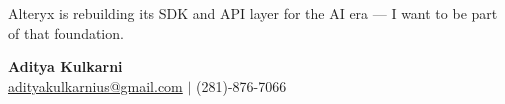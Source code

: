 \documentclass[11pt,letterpaper]{article}
\begin{document}
\vspace{8pt}

Alteryx is rebuilding its SDK and API layer for the AI era --- I want to be part of that foundation.

\vspace{12pt}

{\color{AlteryxPurple} \textbf{Aditya Kulkarni}} \\
\href{mailto:adityakulkarnius@gmail.com}{adityakulkarnius@gmail.com} \quad $|$ \quad (281)-876-7066
\end{document}
